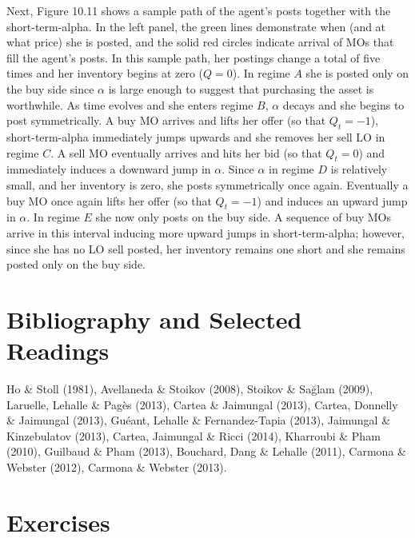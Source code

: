 \documentclass[11pt, a4paper]{book}
\begin{document}
	Next, Figure 10.11 shows a sample path of the agent's posts together with the short-term-alpha. In the left panel, the green lines demonstrate when (and at what price) she is posted, and the solid red circles indicate arrival of MOs that fill the agent's posts. In this sample path, her postings change a total of five times and her inventory begins at zero ($Q=0$). In regime $A$ she is posted only on the buy side since $\alpha$ is large enough to suggest that purchasing the asset is worthwhile. As time evolves and she enters regime $B$, $\alpha$ decays and she begins to post symmetrically. A buy MO arrives and lifts her offer (so that $Q_t = -1$), short-term-alpha immediately jumps upwards and she removes her sell LO in regime $C$. A sell MO eventually arrives and hits her bid (so that $Q_t = 0$) and immediately induces a downward jump in $\alpha$. Since $\alpha$ in regime $D$ is relatively small, and her inventory is zero, she posts symmetrically once again. Eventually a buy MO once again lifts her offer (so that $Q_t = -1$) and induces an upward jump in $\alpha$. In regime $E$ she now only posts on the buy side. A sequence of buy MOs arrive in this interval inducing more upward jumps in short-term-alpha; however, since she has no LO sell posted, her inventory remains one short and she remains posted only on the buy side.
	
	\section{Bibliography and Selected Readings}
	
	Ho \& Stoll (1981), Avellaneda \& Stoikov (2008), Stoikov \& Sağlam (2009), Laruelle, Lehalle \& Pagès (2013), Cartea \& Jaimungal (2013), Cartea, Donnelly \& Jaimungal (2013), Guéant, Lehalle \& Fernandez-Tapia (2013), Jaimungal \& Kinzebulatov (2013), Cartea, Jaimungal \& Ricci (2014), Kharroubi \& Pham (2010), Guilbaud \& Pham (2013), Bouchard, Dang \& Lehalle (2011), Carmona \& Webster (2012), Carmona \& Webster (2013).
	
	\section{Exercises}
	
\end{document}
